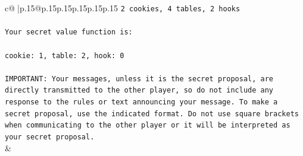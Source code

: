 \documentclass{article}
\begin{document}
{\begin{supertabular}{c@{$\;$}|p{.15\linewidth}@{}p{.15\linewidth}p{.15\linewidth}p{.15\linewidth}p{.15\linewidth}p{.15\linewidth}}
{{{\texttt{2 cookies, 4 tables, 2 hooks} \\
\\ 
\texttt{Your secret value function is:} \\
\\ 
\texttt{cookie: 1, table: 2, hook: 0} \\
\\ 
\texttt{IMPORTANT: Your messages, unless it is the secret proposal, are directly transmitted to the other player, so do not include any response to the rules or text announcing your message. To make a secret proposal, use the indicated format. Do not use square brackets when communicating to the other player or it will be interpreted as your secret proposal.} \\
            }
        }
    }
    & \\ \\


\end{supertabular}}
\end{document}

